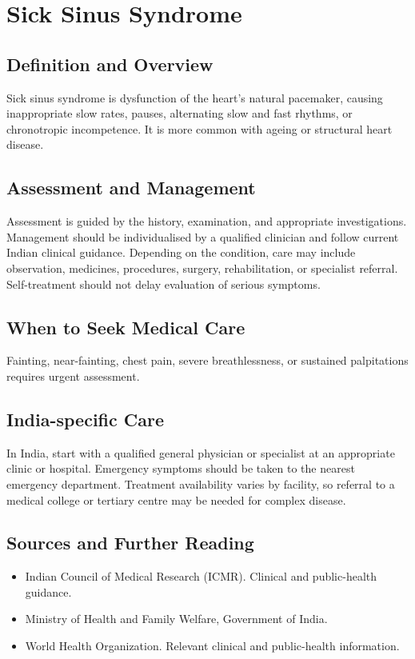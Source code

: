 \chapter{Sick Sinus Syndrome}

\section*{Definition and Overview}
Sick sinus syndrome is dysfunction of the heart's natural pacemaker, causing inappropriate slow rates, pauses, alternating slow and fast rhythms, or chronotropic incompetence. It is more common with ageing or structural heart disease.

\section*{Assessment and Management}
Assessment is guided by the history, examination, and appropriate investigations. Management should be individualised by a qualified clinician and follow current Indian clinical guidance. Depending on the condition, care may include observation, medicines, procedures, surgery, rehabilitation, or specialist referral. Self-treatment should not delay evaluation of serious symptoms.

\section*{When to Seek Medical Care}
Fainting, near-fainting, chest pain, severe breathlessness, or sustained palpitations requires urgent assessment.

\section*{India-specific Care}
In India, start with a qualified general physician or specialist at an appropriate clinic or hospital. Emergency symptoms should be taken to the nearest emergency department. Treatment availability varies by facility, so referral to a medical college or tertiary centre may be needed for complex disease.

\section*{Sources and Further Reading}
\begin{itemize}
    \item Indian Council of Medical Research (ICMR). Clinical and public-health guidance.
    \item Ministry of Health and Family Welfare, Government of India.
    \item World Health Organization. Relevant clinical and public-health information.
\end{itemize}

